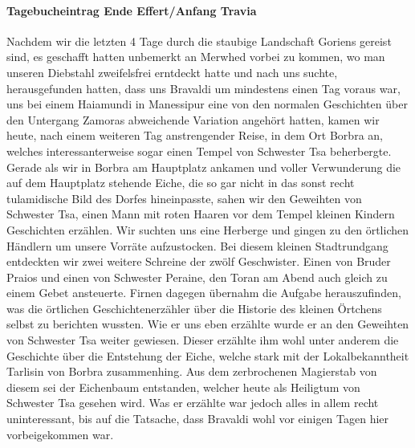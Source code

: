 \paragraph{Tagebucheintrag Ende Effert/Anfang Travia}
Nachdem wir die letzten 4 Tage durch die staubige Landschaft Goriens gereist sind, es geschafft hatten unbemerkt an Merwhed vorbei zu kommen, wo man unseren Diebstahl zweifelsfrei erntdeckt hatte und nach uns suchte, herausgefunden hatten, dass uns Bravaldi um mindestens einen Tag voraus war, uns bei einem Haiamundi in Manessipur eine von den normalen Geschichten über den Untergang Zamoras abweichende Variation angehört hatten, kamen wir heute, nach einem weiteren Tag anstrengender Reise, in dem Ort Borbra an, welches interessanterweise sogar einen Tempel von Schwester Tsa beherbergte. Gerade als wir in Borbra am Hauptplatz ankamen und voller Verwunderung die auf dem Hauptplatz stehende Eiche, die so gar nicht in das sonst recht tulamidische Bild des Dorfes hineinpasste, sahen wir den Geweihten von Schwester Tsa, einen Mann mit roten Haaren vor dem Tempel kleinen Kindern Geschichten erzählen. Wir suchten uns eine Herberge und gingen zu den örtlichen Händlern um unsere Vorräte aufzustocken. Bei diesem kleinen Stadtrundgang entdeckten wir zwei weitere Schreine der zwölf Geschwister. Einen von Bruder Praios und einen von Schwester Peraine, den Toran am Abend auch gleich zu einem Gebet ansteuerte. Firnen dagegen übernahm die Aufgabe herauszufinden, was die örtlichen Geschichtenerzähler über die Historie des kleinen Örtchens selbst zu berichten wussten. Wie er uns eben erzählte wurde er an den Geweihten von Schwester Tsa weiter gewiesen. Dieser erzählte ihm wohl unter anderem die Geschichte über die Entstehung der Eiche, welche stark mit der Lokalbekanntheit Tarlisin von Borbra zusammenhing. Aus dem zerbrochenen Magierstab von diesem sei der Eichenbaum entstanden, welcher heute als Heiligtum von Schwester Tsa gesehen wird. Was er erzählte war jedoch alles in allem recht uninteressant, bis auf die Tatsache, dass Bravaldi wohl vor einigen Tagen hier vorbeigekommen war.

